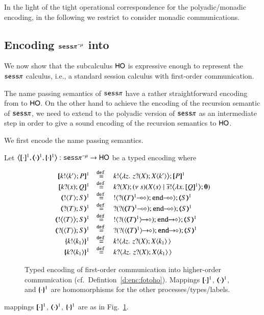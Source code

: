 In the light of the tight operational correspondence for the polyadic/monadic encoding,
in the following we restrict to consider monadic communications.

\subsection{Encoding $\mathtt{sess}\pi^{-\mu}$  into \HO}\label{ss:ffotoho}

We now show that the subcalculus $\mathsf{HO}$ is expressive enough to
represent the $\mathtt{sess}\pi$ calculus, i.e., a standard  session calculus with first-order communication.


The name passing semantics of $\mathtt{sess}\pi$ have a rather straightforward
encoding from to $\mathsf{HO}$.
On the other hand to achieve the encoding of the recursion semantic
of $\mathtt{sess}\pi$, we need to extend
to the polyadic version of $\mathtt{sess}\pi$ as an intermediate step in order
to give a sound encoding of the recursion semantics to $\mathsf{HO}$.

We first encode the name passing semantics.

\begin{definition}\label{d:enc:fotoho}
   Let  $\enco{\map{\cdot}^{1}, \mapt{\cdot}^{1}, \mapa{\cdot}^{1}}: \sessp^{-\mu} \to \HO$ be a typed encoding where
\begin{figure}[t]
	\[
	\begin{array}{rcl}
		\pmap{\bout{k}{k'} P}{1}		&\defeq&	\bbout{k}{ \abs{z}{\,\binp{z}{X} \appl{X}{k'}} } \pmap{P}{1} \\
		\pmap{\binp{k}{x} Q}{1}			&\defeq&	\binp{k}{X} \newsp{s}{\appl{X}{s} \Par \bbout{\dual{s}}{\abs{x}{\pmap{Q}{1}}} \inact} \\
		\tmap{\btout{T} {S} }{1}		&\defeq&	\btout{\lhot{\btinp{\lhot{\tmap{T}{1}}}\tinact}} \tmap{S}{1}  \\
		\tmap{\btinp{T} S }{1}		&\defeq&	\btinp{\lhot{\btinp{\lhot{\tmap{T}{1}}}\tinact}} \tmap{S}{1} \\
		\tmap{\bbtout{\chtype{T}}{S}}{1}	&\defeq&	\btout{\shot{\btinp{\shot{\chtype{\tmap{T}{1}}}}\tinact}} \tmap{S}{1}  \\
		\tmap{\bbtinp{\chtype{T}}{S}}{1}	&\defeq&	\btinp{\shot{\btinp{\shot{\chtype{\tmap{T}{1}}}}\tinact}} \tmap{S}{1}  \\
		\mapa{\bactout{k}{k_1}}^{1} &\defeq&   \bactout{k}{\abs{z}{\,\binp{z}{X} \appl{X}{k_1}}\, } \\
		\mapa{\bactinp{k}{k_1}}^{1} &\defeq&   \bactinp{k}{\abs{z}{\,\binp{z}{X} \appl{X}{k_1}}\, }
	\end{array}
	\]
	\caption{\label{f:enc:fotoho}
Typed encoding of first-order communication into higher-order communication (cf.~Defintion~\ref{d:enc:fotoho}).
Mappings 
$[\!\![\cdot]\!\!]^1$,
$(\!\!\langle\cdot\rangle\!\!)^1$, 
and 
$\{\!\!\{\cdot\}\!\!\}^1$
are homomorphisms for the other processes/types/labels. 
}
\end{figure}
mappings $[\!\![\cdot]\!\!]^{1}$, $(\!\!\langle\cdot\rangle\!\!)^{1}$, $\{\!\!\{\cdot\}\!\!\}^{1}$
are 
as in Fig.~\ref{f:enc:fotoho}.
\end{definition}

